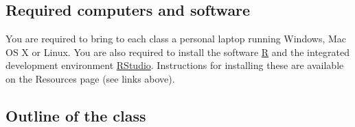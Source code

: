 \documentclass[
]{article}
\begin{document}
\hypertarget{required-computers-and-software}{%
\subsection{Required computers and
software}\label{required-computers-and-software}}

You are required to bring to each class a personal laptop running
Windows, Mac OS X or Linux. You are also required to install the
software \href{http://cran.r-project.org}{R} and the integrated
development environment \href{https://www.rstudio.com}{RStudio}.
Instructions for installing these are available on the Resources page
(see links above).

\hypertarget{outline-of-the-class}{%
\subsection{Outline of the class}\label{outline-of-the-class}}
\end{document}
